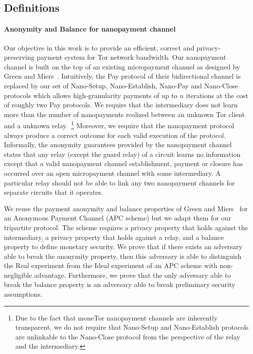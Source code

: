 
\subsection{Definitions}

\paragraph*{Anonymity and Balance for nanopayment channel}
Our objective in this work is to provide an efficient, correct and
privacy-preserving payment system for Tor network bandwidth. Our nanopayment
channel is built on the top of an existing micropayment channel as designed by
Green and Miers~\cite{green2017bolt}. Intuitively, the Pay protocol of their
bidirectional channel is replaced by our set of Nano-Setup, Nano-Establish,
Nano-Pay and Nano-Close protocols which allows high-granularity payments of up
to $n$ iterations at the cost of roughly two Pay protocols.
We require that the intermediary does not learn more than the number of
nanopayments realized between an unknown Tor client and a unknown
relay.~\footnote{Due to the fact that moneTor nanopayment channels are
  inherently transparent, we do not require that Nano-Setup and Nano-Establish
  protocols are unlinkable to the Nano-Close protocol from the perspective of
  the relay and the intermediary.} Moreover, we require that the nanopayment
protocol always produce a correct outcome for each valid execution of the
protocol. Informally, the anonymity guarantees provided by the nanopayment
channel states that any relay (except the guard relay) of a circuit learns no
information except that a valid nanopayment channel establishment, payment or
closure has occurred over an open micropayment channel with some intermediary. A
particular relay should not be able to link any two nanopayment channels for
separate circuits that it operates.

We reuse the payment anonymity and balance properties of Green and
Miers~\cite{bolt-eprint} for an Anonymous Payment Channel (APC scheme) but we
adapt them for our tripartite protocol. The scheme requires a privacy property
that holds against the intermediary, a privacy property that holds against a
relay, and a balance property to define monetary security. We prove that if
there exists an adversary able to break the anonymity property, then this
adversary is able to distinguish the Real experiment from the Ideal experiment
of an APC scheme with non-negligible advantage. Furthermore, we prove that the
only adversary able to break the balance property is an adversary able to break
preliminary security assumptions.

